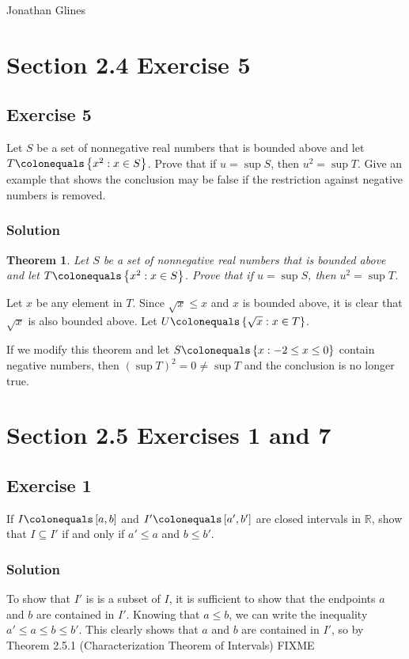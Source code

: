 \documentclass[12pt]{article}
\newtheorem*{thm}{Theorem}
\begin{document}
\begin{flushright}
\Large{Jonathan Glines}
\end{flushright}
\section*{Section 2.4 Exercise 5}

\subsection*{Exercise 5}
Let $S$ be a set of nonnegative real numbers that is bounded above and let $T \colonequals \left\{x^2 : x \in S\right\}$. Prove that if $u = \sup S$, then $u^2 = \sup T$. Give an example that shows the conclusion may be false if the restriction against negative numbers is removed.


\subsubsection*{Solution}
\begin{thm}
Let $S$ be a set of nonnegative real numbers that is bounded above and let $T \colonequals \left\{x^2 : x \in S\right\}$. Prove that if $u = \sup S$, then $u^2 = \sup T$.
\end{thm}

Let $x$ be any element in $T$. Since $\sqrt{x} \leq x$ and $x$ is bounded above, it is clear that $\sqrt{x}$ is also bounded above. Let $U \colonequals \left\{\sqrt{x} : x \in T\right\}$.

If we modify this theorem and let $S \colonequals \left\{x : -2 \leq x \leq 0\right\}$ contain negative numbers, then $\left(\sup T\right)^2 = 0 \neq \sup T$ and the conclusion is no longer true.

\section*{Section 2.5 Exercises 1 and 7}

\subsection*{Exercise 1}
If $I \colonequals \left[a, b\right]$ and $I' \colonequals \left[a', b'\right]$ are closed intervals in $\mathbb{R}$, show that $I \subseteq I'$ if and only if $a' \leq a$ and $b \leq b'$.

\subsubsection*{Solution}
To show that $I'$ is is a subset of $I$, it is sufficient to show that the endpoints $a$ and $b$ are contained in $I'$. Knowing that $a \leq b$, we can write the inequality $a' \leq a \leq b \leq b'$. This clearly shows that $a$ and $b$ are contained in $I'$, so by Theorem 2.5.1 (Characterization Theorem of Intervals) FIXME
\end{document}
